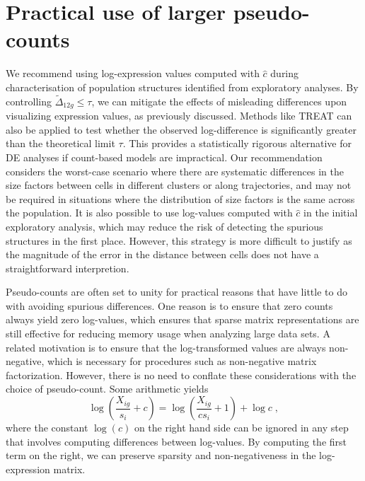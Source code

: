 \documentclass[10pt,letterpaper]{article}
\begin{document}
\section{Practical use of larger pseudo-counts}
We recommend using log-expression values computed with $\hat c$ during characterisation of population structures identified from exploratory analyses.
By controlling $\tilde\Delta_{12g} \le \tau$, we can mitigate the effects of misleading differences upon visualizing expression values, as previously discussed.
Methods like TREAT \cite{mccarthy2009testing} can also be applied to test whether the observed log-difference is significantly greater than the theoretical limit $\tau$.
This provides a statistically rigorous alternative for DE analyses if count-based models are impractical.
Our recommendation considers the worst-case scenario where there are systematic differences in the size factors between cells in different clusters or along trajectories, 
and may not be required in situations where the distribution of size factors is the same across the population.
It is also possible to use log-values computed with $\hat c$ in the initial exploratory analysis, which may reduce the risk of detecting the spurious structures in the first place.
However, this strategy is more difficult to justify as the magnitude of the error in the distance between cells does not have a straightforward interpretion.

Pseudo-counts are often set to unity for practical reasons that have little to do with avoiding spurious differences.
One reason is to ensure that zero counts always yield zero log-values, which ensures that sparse matrix representations are still effective for reducing memory usage when analyzing large data sets.
A related motivation is to ensure that the log-transformed values are always non-negative, which is necessary for procedures such as non-negative matrix factorization.
However, there is no need to conflate these considerations with the choice of pseudo-count.
Some arithmetic yields 
\[
 \log\left(\frac{X_{ig}}{s_i}+ c\right) = \log\left(\frac{X_{ig}}{cs_i}+ 1\right) + \log c \;,
\]
where the constant $\log(c)$ on the right hand side can be ignored in any step that involves computing differences between log-values.
By computing the first term on the right, we can preserve sparsity and non-negativeness in the log-expression matrix.
\end{document}
